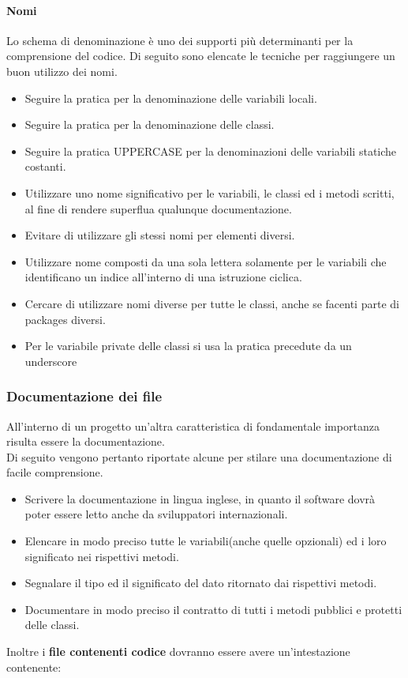\paragraph{Nomi}
Lo schema di denominazione è uno dei supporti più determinanti per la comprensione del codice.
Di seguito sono elencate le tecniche per raggiungere un buon utilizzo dei nomi.

\begin{itemize}
\item Seguire la pratica  per la denominazione delle variabili locali.
\item Seguire la pratica  per la denominazione delle classi.
\item Seguire la pratica UPPER\textunderscore CASE per la denominazioni delle variabili statiche costanti.
\item Utilizzare uno nome significativo per le variabili, le classi ed i metodi scritti, al fine di rendere superflua qualunque documentazione.
\item Evitare di utilizzare gli stessi nomi per elementi diversi.
\item Utilizzare nome composti da una sola lettera solamente per le variabili che identificano un indice all'interno di una istruzione ciclica.
\item Cercare di utilizzare nomi diverse per tutte le classi, anche se facenti parte di packages diversi.
\item Per le variabile private delle classi si usa la pratica  precedute da un underscore 
\end{itemize}

\subsubsection{Documentazione dei file}
All'interno di un progetto  un'altra caratteristica di fondamentale importanza risulta essere la documentazione. \\
Di seguito vengono pertanto riportate alcune  per stilare una documentazione di facile comprensione.

\begin{itemize}
\item Scrivere la documentazione in lingua inglese, in quanto il software dovrà poter essere letto anche da sviluppatori internazionali.
\item Elencare in modo preciso tutte le variabili(anche quelle opzionali) ed i loro significato nei rispettivi metodi.
\item Segnalare il tipo ed il significato del dato ritornato dai rispettivi metodi.
\item Documentare in modo preciso il contratto di tutti i metodi pubblici e protetti delle classi.
\end{itemize}
Inoltre i \textbf{file contenenti codice} dovranno essere avere un’intestazione contenente:

